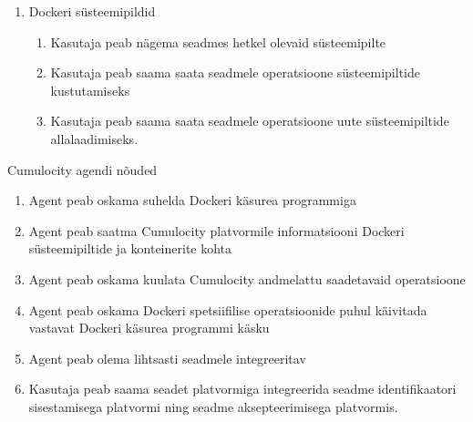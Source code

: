 \documentclass[12pt]{article}
\begin{document}
\begin{enumerate}
\begin{enumerate}
    \end{enumerate}
    \item Dockeri süsteemipildid
    \begin{enumerate}
      \item Kasutaja peab nägema seadmes hetkel olevaid süsteemipilte
      \item Kasutaja peab saama saata seadmele operatsioone süsteemipiltide kustutamiseks
      \item Kasutaja peab saama saata seadmele operatsioone uute süsteemipiltide allalaadimiseks.
    \end{enumerate}
  \end{enumerate}
 
  \newline
  \noindent
  Cumulocity agendi nõuded
  \begin{enumerate}
    \item Agent peab oskama suhelda Dockeri käsurea programmiga
    \item Agent peab saatma Cumulocity platvormile informatsiooni Dockeri süsteemipiltide ja konteinerite kohta
    \item Agent peab oskama kuulata Cumulocity andmelattu saadetavaid operatsioone
    \item Agent peab oskama Dockeri spetsiifilise operatsioonide puhul käivitada vastavat Dockeri käsurea programmi käsku
    \item Agent peab olema lihtsasti seadmele integreeritav
    \item Kasutaja peab saama seadet platvormiga integreerida seadme identifikaatori
          sisestamisega platvormi ning seadme aksepteerimisega platvormis.
  \end{enumerate}
  
 
 
\end{document}
